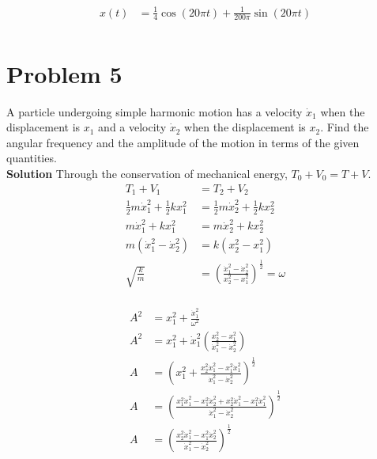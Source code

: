 \documentclass[]{article}
\newcommand{\bd}{\textbf}
\begin{document}
	\begin{equation}
		\begin{split}
			x(t) &= \frac{1}{4}\cos(20\pi t) + \frac{1}{200\pi}\sin(20\pi t) \\
		\end{split}
	\end{equation}

	
	\section{Problem 5}
	
	A particle undergoing simple harmonic motion has a velocity $ \dot{x}_1 $ when the displacement is $ x_1 $ and a velocity $ \dot{x}_2 $ when the displacement is $ x_2 $. Find the angular frequency and the amplitude of the motion in terms of the given quantities. \\
	
	\bd{Solution} Through the conservation of mechanical energy, $ T_0 + V_0 = T + V $. 
	\begin{equation}
		\begin{split}
			T_1 + V_1 &= T_2 + V_2 \\
			\frac{1}{2} m \dot{x}_1^2 + \frac{1}{2} k x_1^2 &= \frac{1}{2} m \dot{x}_2^2 + \frac{1}{2} k x_2^2 \\
			m \dot{x}_1^2 + k x_1^2 &= m \dot{x}_2^2 + k x_2^2 \\
			m \left( \dot{x}_1^2 - \dot{x}_2^2 \right) &= k \left( x_2^2 - x_1^2 \right) \\
			\sqrt{\frac{k}{m}} &= \left( \frac{\dot{x}_1^2 - \dot{x}_2^2} {x_2^2 - x_1^2}  \right)^\frac{1}{2} = \omega \\
		\end{split}
	\end{equation}

	\begin{equation}
		\begin{split}
			A^2 &= x_1^2 + \frac{\dot{x}_1^2}{\omega^2} \\
			A^2 &= x_1^2 + \dot{x}_1^2 \left( \frac{x_2^2 - x_1^2} {\dot{x}_1^2 - \dot{x}_2^2} \right) \\
			A &= \left( x_1^2 + \frac{x_2^2 \dot{x}_1^2 - x_1^2 \dot{x}_1^2} {\dot{x}_1^2 - \dot{x}_2^2} \right)^\frac{1}{2} \\
			A &= \left( \frac{ x_1^2 \dot{x}_1^2 - x_1^2 \dot{x}_2^2 + x_2^2 \dot{x}_1^2 - x_1^2 \dot{x}_1^2} {\dot{x}_1^2 - \dot{x}_2^2} \right)^\frac{1}{2} \\
			A &= \left( \frac{ x_2^2 \dot{x}_1^2 - x_1^2 \dot{x}_2^2 } {\dot{x}_1^2 - \dot{x}_2^2} \right)^\frac{1}{2} \\
		\end{split}
	\end{equation}
\end{document}

